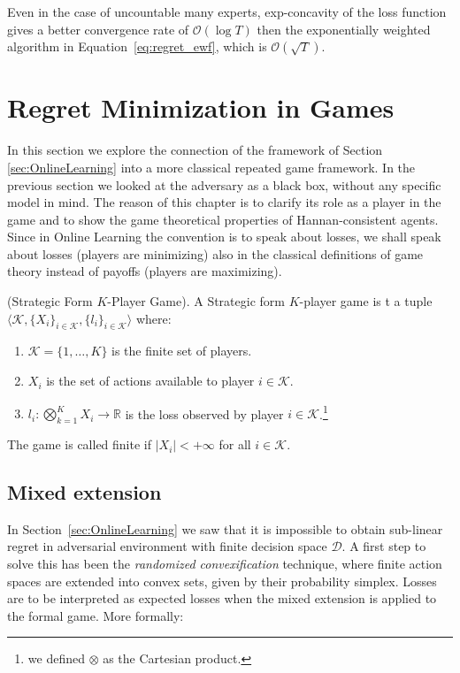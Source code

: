 Even in the case of uncountable many experts, exp-concavity of the loss function gives a better convergence rate of $\mathcal O(\log T)$ then the exponentially weighted algorithm in Equation~\eqref{eq:regret_ewf}, which is $\mathcal O(\sqrt T)$.

\section{Regret Minimization in Games}
\label{sec:GT}
In this section we explore the connection of the framework of Section \ref{sec:OnlineLearning} into a more classical repeated game framework. In the previous section we looked at the adversary as a black box, without any specific model in mind. The reason of this chapter is to clarify its role as a player in the game and to show the game theoretical properties of Hannan-consistent agents. Since in Online Learning the convention is to speak about losses, we shall speak about losses (players are minimizing) also in the classical definitions of game theory instead of payoffs (players are maximizing).

\begin{definition}(Strategic Form $K$-Player Game).\label{def:Game}
    A Strategic form $K$-player game is t a tuple $\langle\mathcal K,\{X_i\}_{i\in\mathcal K},\{l_i\}_{i\in\mathcal K}\rangle$ where:
    \begin{enumerate}
        \item $\mathcal K=\{1,\ldots,K\}$ is the finite set of players.
        \item $X_i$ is the set of actions available to player $i\in\mathcal K$.
        \item $l_i:\bigotimes\limits_{k=1}^KX_i\to\mathbb R$ is the loss observed by player $i\in\mathcal K$.\footnote{we defined $\otimes$ as the Cartesian product.}
    \end{enumerate}
	The game is called finite if $|X_i|<+\infty$ for all $i\in\mathcal K$.
\end{definition}


\subsection{Mixed extension}\label{sec:mixed}
In Section~\ref{sec:OnlineLearning} we saw that it is impossible to obtain sub-linear regret in adversarial environment with finite decision space $\mathcal D$. A first step to solve this has been the \emph{randomized convexification} technique, where finite action spaces are extended into convex sets, given by their probability simplex. Losses are to be interpreted as expected losses when the mixed extension is applied to the formal game. More formally: 

